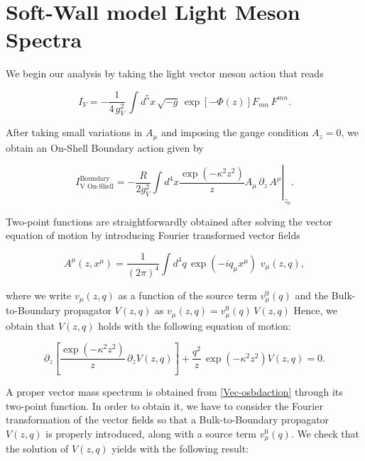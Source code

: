 \documentclass{PoS}
\begin{document}
\section{Soft-Wall model Light Meson Spectra}


We begin our analysis by taking the light vector meson action that reads 

\begin{equation}
I_{V}=-\frac{1}{4\,g_V^2}\,\int{d^5x\,\sqrt{-g}\,\exp[-\Phi\left(z\right)]F_{mn}\,F^{mn}}.
\label{Vector-action}
\end{equation}

After taking small variations in $A_{\mu}$ and imposing the gauge condition $A_z=0$, we obtain an On-Shell Boundary action given by

\begin{equation}
I_{\text{V On-Shell}}^{\text{Boundary}}=-\frac{R}{2g_{V}^{2}}\int{d^{4}x\left. \frac{\exp(-\kappa^{2}z^{2})}{z}A_{\mu}\,\partial_{z}\,A^{\mu}\right|_{z_{0}}}.
\label{Vec-osbdaction}
\end{equation}

Two-point functions are straightforwardly obtained after solving the vector equation of motion by introducing Fourier transformed vector fields 

\begin{equation}
A^{\mu}(z,x^{\mu})=\frac{1}{(2\pi)^{4}}\int{d^{4}q\,\exp(-iq_{\mu}x^{\mu})\,\,v_{\mu}(z,q)},
\label{vector-ft}
\end{equation}

\noindent where we write $v_{\mu}(z,q)$ as a function of the source term $v_{\mu}^{0}(q)$ and the Bulk-to-Boundary propagator $V(z,q)$ as $v_{\mu}(z,q)=v_{\mu}^{0}\left(q\right)\,V(z,q)$ Hence, we obtain that $V(z,q)$ holds with the following equation of motion:

\begin{equation}
\partial_{z}\left[\frac{\exp(-\kappa^{2}z^{2})}{z}\,\partial_{z}V(z,q)\right]+\frac{q^{2}}{z}\,\exp(-\kappa^{2}z^{2})V(z,q)=0.
\label{eom-BtoBp}
\end{equation}

A proper vector mass spectrum is obtained from \ref{Vec-osbdaction} through its two-point function. In order to obtain it, we have to consider the Fourier transformation of the vector fields so that a Bulk-to-Boundary propagator $V(z,q)$ is properly introduced, along with a source term $v_{\mu}^{0}(q)$. We check that the solution of $V(z,q)$ yields with the following result:
\end{document}
